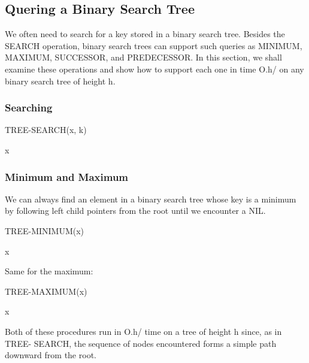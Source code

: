 \subsection{Quering a Binary Search Tree}

We often need to search for a key stored in a binary search tree. Besides the
SEARCH operation, binary search trees can support such queries as MINIMUM,
MAXIMUM, SUCCESSOR, and PREDECESSOR. In this section, we shall examine
these operations and show how to support each one in time O.h/ on any binary
search tree of height h.

\subsubsection*{Searching}


\begin{algorithm}
    \caption{TREE-SEARCH(x, k)}
    \Return x
\end{algorithm}

\subsubsection*{Minimum and Maximum}

We can always find an element in a binary search tree whose key is a minimum by
following left child pointers from the root until we encounter a NIL.

\begin{algorithm}
    \caption{TREE-MINIMUM(x)}
    \Return x
\end{algorithm}

Same for the maximum:

\begin{algorithm}
    \caption{TREE-MAXIMUM(x)}
    \Return x
\end{algorithm}

Both of these procedures run in O.h/ time on a tree of height h since, as in TREE-
SEARCH, the sequence of nodes encountered forms a simple path downward from
the root.

